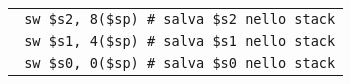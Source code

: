 \documentclass[../main.tex]{subfiles}
\begin{document}
\begin{tabular}{ l }
    \texttt{\hspace*{0cm} \hspace*{0cm} \hspace*{0cm} \hspace*{0cm} \hspace*{0cm} \hspace*{0cm} \hspace*{0cm} \hspace*{0cm} \hspace*{0cm} sw \$s2, 8(\$sp) \hspace*{0cm} \hspace*{0cm} \hspace*{0cm} \hspace*{0cm} \hspace*{0cm} \hspace*{0cm} \hspace*{0cm} \hspace*{0cm} \# salva \$s2 nello stack} \\
    \texttt{\hspace*{0cm} \hspace*{0cm} \hspace*{0cm} \hspace*{0cm} \hspace*{0cm} \hspace*{0cm} \hspace*{0cm} \hspace*{0cm} \hspace*{0cm} sw \$s1, 4(\$sp) \hspace*{0cm} \hspace*{0cm} \hspace*{0cm} \hspace*{0cm} \hspace*{0cm} \hspace*{0cm} \hspace*{0cm} \hspace*{0cm} \# salva \$s1 nello stack} \\
    \texttt{\hspace*{0cm} \hspace*{0cm} \hspace*{0cm} \hspace*{0cm} \hspace*{0cm} \hspace*{0cm} \hspace*{0cm} \hspace*{0cm} \hspace*{0cm} sw \$s0, 0(\$sp) \hspace*{0cm} \hspace*{0cm} \hspace*{0cm} \hspace*{0cm} \hspace*{0cm} \hspace*{0cm} \hspace*{0cm} \hspace*{0cm} \# salva \$s0 nello stack} \\

\end{tabular}
\end{document}
